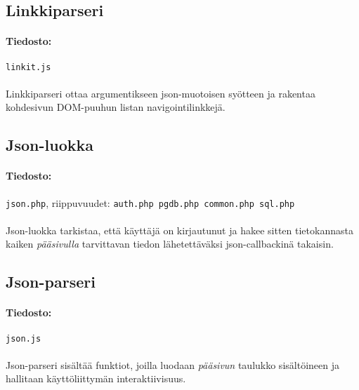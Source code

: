 \documentclass[11pt]{article}
\begin{document}

\subsection{Linkkiparseri}

\paragraph{Tiedosto:} \large{\texttt{linkit.js}}

\paragraph{} Linkkiparseri ottaa argumentikseen json-muotoisen syötteen ja rakentaa kohdesivun DOM-puuhun listan navigointilinkkejä.


\subsection{Json-luokka}

\paragraph{Tiedosto:} \large{\texttt{json.php}}, riippuvuudet: \texttt{auth.php pgdb.php common.php sql.php}

\paragraph{} Json-luokka tarkistaa, että käyttäjä on kirjautunut ja hakee sitten tietokannasta kaiken \emph{pääsivulla} tarvittavan tiedon lähetettäväksi json-callbackinä takaisin.


\subsection{Json-parseri}

\paragraph{Tiedosto:} \large{\texttt{json.js}}

\paragraph{} Json-parseri sisältää funktiot, joilla luodaan \emph{pääsivun} taulukko sisältöineen ja hallitaan käyttöliittymän interaktiivisuus.
\end{document}
